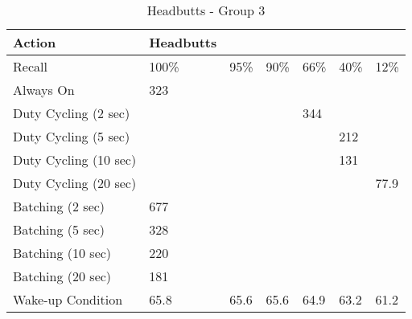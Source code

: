 \begin{table*}[t]
    \begin{tabular}{|l|l|l|l|l|l|l|}
    \hline
    Action                & Headbutts & ~    & ~    & ~    & ~    & ~    \\ \hline
    Recall                & 100\%     & 95\% & 90\% & 66\% & 40\% & 12\% \\ \hline
    Always On             & 323       & ~    & ~    & ~    & ~    & ~    \\ \hline
    Duty Cycling (2 sec)  & ~         & ~    & ~    & 344  & ~    & ~    \\ \hline
    Duty Cycling (5 sec)  & ~         & ~    & ~    & ~    & 212  & ~    \\ \hline
    Duty Cycling (10 sec) & ~         & ~    & ~    & ~    & 131  & ~    \\ \hline
    Duty Cycling (20 sec) & ~         & ~    & ~    & ~    & ~    & 77.9 \\ \hline
    Batching (2 sec)      & 677       & ~    & ~    & ~    & ~    & ~    \\ \hline
    Batching (5 sec)      & 328       & ~    & ~    & ~    & ~    & ~    \\ \hline
    Batching (10 sec)     & 220       & ~    & ~    & ~    & ~    & ~    \\ \hline
    Batching (20 sec)     & 181       & ~    & ~    & ~    & ~    & ~    \\ \hline
    Wake-up Condition     & 65.8      & 65.6 & 65.6 & 64.9 & 63.2 & 61.2 \\ \hline
    \end{tabular}
	\caption{Headbutts - Group 3}
	\label{table:powerProfileNexus}
\end{table*}
\fi

